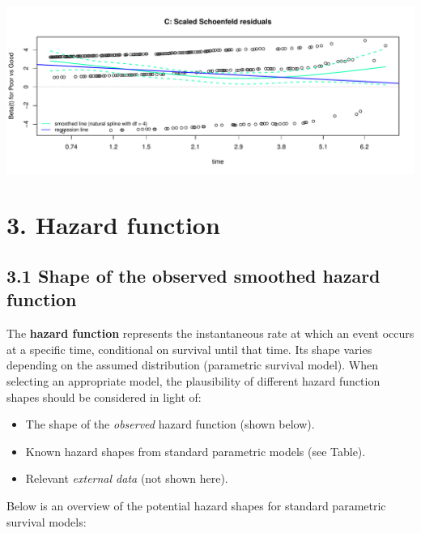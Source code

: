 \documentclass[
]{article}
\providecommand{\tightlist}{%
  \setlength{\itemsep}{0pt}\setlength{\parskip}{0pt}}
\begin{document}
\begin{flushleft}\includegraphics[height=0.29\textheight]{BC_OS_output/Images/Figure_PH_assumption-3} \end{flushleft}

\clearpage

\section{3. Hazard function}\label{hazard-function}

\subsection{3.1 Shape of the observed smoothed hazard
function}\label{shape-of-the-observed-smoothed-hazard-function}

The \textbf{hazard function} represents the instantaneous rate at which
an event occurs at a specific time, conditional on survival until that
time. Its shape varies depending on the assumed distribution (parametric
survival model). When selecting an appropriate model, the plausibility
of different hazard function shapes should be considered in light of:

\begin{itemize}
\tightlist
\item
  The shape of the \emph{observed} hazard function (shown below).
\item
  Known hazard shapes from standard parametric models (see Table).
\item
  Relevant \emph{external data} (not shown here).
\end{itemize}

Below is an overview of the potential hazard shapes for standard
parametric survival models:
\end{document}
